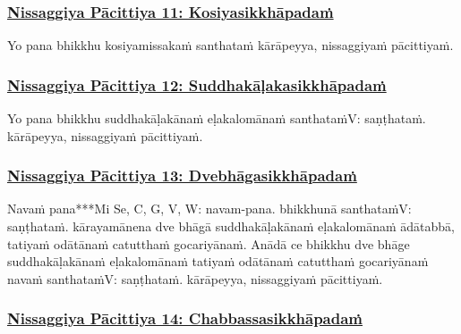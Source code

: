\subsubsection*{\hyperref[forf-exp11]{Nissaggiya Pācittiya 11: Kosiyasikkhāpadaṁ}}
\label{np11}

Yo pana bhikkhu kosiyamissakaṁ santhataṁ kārāpeyya, nissaggiyaṁ pācittiyaṁ.



\subsubsection*{\hyperref[forf-exp12]{Nissaggiya Pācittiya 12: Suddhakāḷakasikkhāpadaṁ}}
\label{np12}

Yo pana bhikkhu suddhakāḷakānaṁ eḷakalomānaṁ santhataṁ\makeatletter\hyperlink{endnote-appendix}\makeatother V: saṇṭhataṁ. kārāpeyya, nissaggiyaṁ pācittiyaṁ.



\subsubsection*{\hyperref[forf-exp13]{Nissaggiya Pācittiya 13: Dvebhāgasikkhāpadaṁ}}
\label{np13}

Navaṁ pana***Mi Se, C, G, V, W: navam-pana. bhikkhunā santhataṁ\makeatletter\hyperlink{endnote-appendix}\makeatother V: saṇṭhataṁ. kārayamānena dve bhāgā suddhakāḷakānaṁ eḷakalomānaṁ ādātabbā, tatiyaṁ odātānaṁ catutthaṁ gocariyānaṁ. Anādā ce bhikkhu dve bhāge suddhakāḷakānaṁ eḷakalomānaṁ tatiyaṁ odātānaṁ catutthaṁ gocariyānaṁ navaṁ santhataṁ\makeatletter\hyperlink{endnote-appendix}\makeatother V: saṇṭhataṁ. kārāpeyya, nissaggiyaṁ pācittiyaṁ.



\subsubsection*{\hyperref[forf-exp14]{Nissaggiya Pācittiya 14: Chabbassasikkhāpadaṁ}}
\label{np14}

